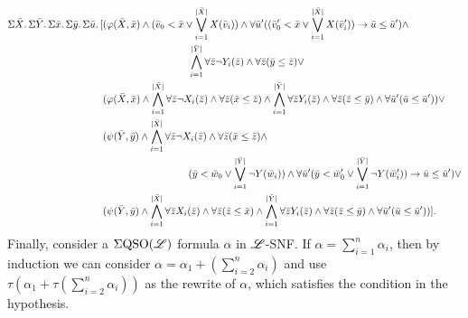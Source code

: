 \begin{align*}
\sa{\bar{X}}\sa{\bar{Y}}\sa{\bar{x}}\sa{\bar{y}}\sa{\bar{u}}[&(\varphi(\bar{X},\bar{x})\wedge(\bar{v}_0 < \bar{x} \vee \bigvee_{i = 1}^{\length{\bar{X}}}X(\bar{v}_i))\wedge \forall\bar{u}'((\bar{v}_0' < \bar{x} \vee \bigvee_{i = 1}^{\length{\bar{X}}}X(\bar{v}_i'))\to\bar{u}\leq\bar{u}') \wedge \\
& \hspace{3cm}  \bigwedge_{i = 1}^{\length{\bar{Y}}} \forall\bar{z}\neg Y_i(\bar{z}) \wedge \forall\bar{z}(\bar{y}\leq\bar{z})\vee\\
&
(\varphi(\bar{X},\bar{x})\wedge\bigwedge_{i = 1}^{\length{\bar{X}}} \forall\bar{z}\neg X_i(\bar{z}) \wedge \forall\bar{z}(\bar{x}\leq\bar{z})\wedge\bigwedge_{i = 1}^{\length{\bar{Y}}} \forall\bar{z} Y_i(\bar{z}) \wedge \forall\bar{z}(\bar{z}\leq\bar{y})\wedge\forall\bar{u}'(\bar{u}\leq\bar{u}'))\vee
\\
&(\psi(\bar{Y},\bar{y})\wedge\bigwedge_{i = 1}^{\length{\bar{X}}} \forall\bar{z}\neg X_i(\bar{z}) \wedge \forall\bar{z}(\bar{x}\leq\bar{z})\wedge \\
& \hspace{3cm} (\bar{y} < \bar{w}_0 \vee \bigvee_{i = 1}^{\length{\bar{Y}}}\neg Y(\bar{w}_i))\wedge\forall\bar{u}'(\bar{y} < \bar{w}_0' \vee \bigvee_{i = 1}^{\length{\bar{Y}}}\neg Y(\bar{w}_i'))\to\bar{u}\leq\bar{u}')\vee \\
&(\psi(\bar{Y},\bar{y})\wedge\bigwedge_{i = 1}^{\length{\bar{X}}} \forall\bar{z} X_i(\bar{z}) \wedge \forall\bar{z}(\bar{z}\leq\bar{x})\wedge\bigwedge_{i = 1}^{\length{\bar{Y}}} \forall\bar{z} Y_i(\bar{z}) \wedge \forall\bar{z}(\bar{z}\leq\bar{y})\wedge\forall\bar{u}'(\bar{u}\leq\bar{u}'))].
\end{align*}
Finally, consider a $\Sigma{\rm QSO}(\mathscr{L})$ formula $\alpha$ in $\mathscr{L}$-SNF. If $\alpha = \sum_{i = 1}^n\alpha_i$, then by induction we can consider $\alpha = \alpha_1 + (\sum_{i = 2}^n\alpha_i)$ and use $\tau(\alpha_1 + \tau(\sum_{i = 2}^n\alpha_i))$ as the rewrite of $\alpha$, which satisfies the condition in the hypothesis.